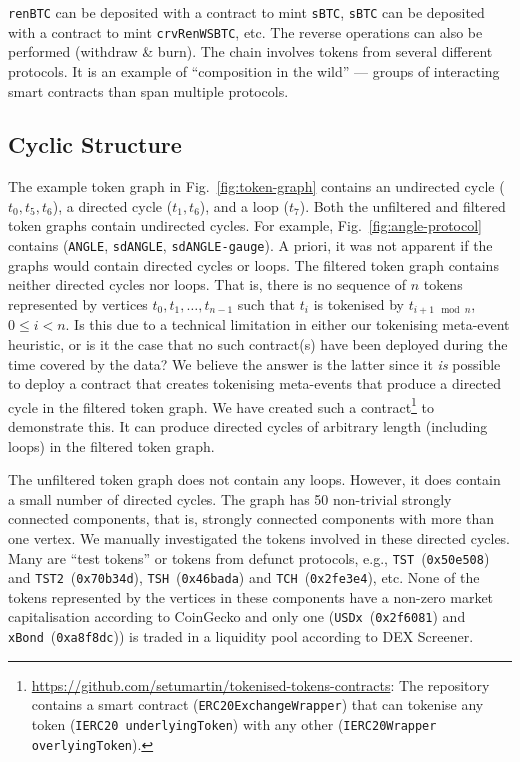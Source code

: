 \texttt{renBTC} can be deposited with a contract to mint
\texttt{sBTC}, \texttt{sBTC} can be deposited with a contract to mint
\texttt{crvRenWSBTC}, etc.  The reverse operations can also be
performed (withdraw \& burn).  The chain involves tokens from several
different protocols.  It is an example of ``composition in the wild''
--- groups of interacting smart contracts than span multiple
protocols.

\subsection{Cyclic Structure}\label{sec:analysis-cyclic-structure}

The example token graph in Fig.~\ref{fig:token-graph} contains an
undirected cycle ($t_0, t_5, t_6$), a directed cycle ($t_1, t_6$), and
a loop ($t_7$).  Both the unfiltered and filtered token graphs contain
undirected cycles.  For example, Fig.~\ref{fig:angle-protocol}
contains (\texttt{ANGLE}, \texttt{sdANGLE}, \texttt{sdANGLE-gauge}).
A priori, it was not apparent if the graphs would contain directed
cycles or loops.  The filtered token graph contains neither directed
cycles nor loops.  That is, there is no sequence of $n$ tokens
represented by vertices $t_0, t_1, \ldots, t_{n - 1}$ such that $t_i$
is tokenised by $t_{i + 1 \mod n}$, $0 \le i < n$.  Is this due to a
technical limitation in either our tokenising meta-event heuristic, or
is it the case that no such contract(s) have been deployed during the
time covered by the data?  We believe the answer is the latter since
it \textit{is} possible to deploy a contract that creates tokenising
meta-events that produce a directed cycle in the filtered token graph.
We have created such a
contract\footnote{\url{https://github.com/setumartin/tokenised-tokens-contracts}:
The repository contains a smart contract
(\texttt{ERC20ExchangeWrapper}) that can tokenise any token
(\texttt{IERC20 underlyingToken}) with any other
(\texttt{IERC20Wrapper overlyingToken}).} to demonstrate this.  It can
produce directed cycles of arbitrary length (including loops) in the
filtered token graph.

The unfiltered token graph does not contain any loops.  However, it
does contain a small number of directed cycles.  The graph has
\num{50} non-trivial strongly connected components, that is, strongly
connected components with more than one vertex.  We manually
investigated the tokens involved in these directed cycles.  Many are
``test tokens'' or tokens from defunct protocols, e.g.,
\texttt{TST}~(\texttt{0x50e508}) and
\texttt{TST2}~(\texttt{0x70b34d}), \texttt{TSH}~(\texttt{0x46bada})
and \texttt{TCH}~(\texttt{0x2fe3e4}), etc.  None of the tokens
represented by the vertices in these components have a non-zero market
capitalisation according to CoinGecko and only one
(\texttt{USDx}~(\texttt{0x2f6081}) and
\texttt{xBond}~(\texttt{0xa8f8dc})) is traded in a liquidity pool
according to DEX Screener.
